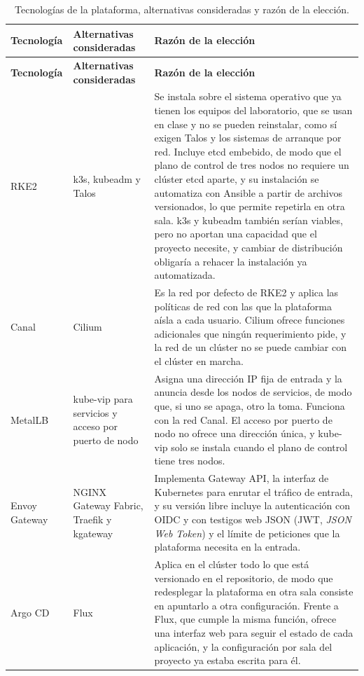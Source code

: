 {\small
\renewcommand{\arraystretch}{1.25}
\begin{xltabular}{\textwidth}{>{\raggedright\arraybackslash}p{0.17\textwidth} >{\raggedright\arraybackslash}p{0.2\textwidth} >{\raggedright\arraybackslash}X}
  \caption{Tecnologías de la plataforma, alternativas consideradas y razón de la elección.}
  \label{tab:seleccion-tecnologias} \\
  \toprule
  \textbf{Tecnología} & \textbf{Alternativas consideradas} & \textbf{Razón de la elección} \\
  \midrule
  \endfirsthead
  \toprule
  \textbf{Tecnología} & \textbf{Alternativas consideradas} & \textbf{Razón de la elección} \\
  \midrule
  \endhead
  \bottomrule
  \endfoot
    RKE2 & k3s, kubeadm y Talos & Se instala sobre el sistema operativo que ya tienen los equipos del laboratorio, que se usan en clase y no se pueden reinstalar, como sí exigen Talos y los sistemas de arranque por red. Incluye etcd embebido, de modo que el plano de control de tres nodos no requiere un clúster etcd aparte, y su instalación se automatiza con Ansible a partir de archivos versionados, lo que permite repetirla en otra sala. k3s y kubeadm también serían viables, pero no aportan una capacidad que el proyecto necesite, y cambiar de distribución obligaría a rehacer la instalación ya automatizada. \\
    \addlinespace[4pt]
    Canal & Cilium & Es la red por defecto de RKE2 y aplica las políticas de red con las que la plataforma aísla a cada usuario. Cilium ofrece funciones adicionales que ningún requerimiento pide, y la red de un clúster no se puede cambiar con el clúster en marcha. \\
    \addlinespace[4pt]
    MetalLB & kube-vip para servicios y acceso por puerto de nodo & Asigna una dirección IP fija de entrada y la anuncia desde los nodos de servicios, de modo que, si uno se apaga, otro la toma. Funciona con la red Canal. El acceso por puerto de nodo no ofrece una dirección única, y kube-vip solo se instala cuando el plano de control tiene tres nodos. \\
    \addlinespace[4pt]
    Envoy Gateway & NGINX Gateway Fabric, Traefik y kgateway & Implementa Gateway API, la interfaz de Kubernetes para enrutar el tráfico de entrada, y su versión libre incluye la autenticación con OIDC y con testigos web JSON (JWT, \emph{JSON Web Token}) y el límite de peticiones que la plataforma necesita en la entrada. \\
    \addlinespace[4pt]
    Argo CD & Flux & Aplica en el clúster todo lo que está versionado en el repositorio, de modo que redesplegar la plataforma en otra sala consiste en apuntarlo a otra configuración. Frente a Flux, que cumple la misma función, ofrece una interfaz web para seguir el estado de cada aplicación, y la configuración por sala del proyecto ya estaba escrita para él. \\

\end{xltabular}}
